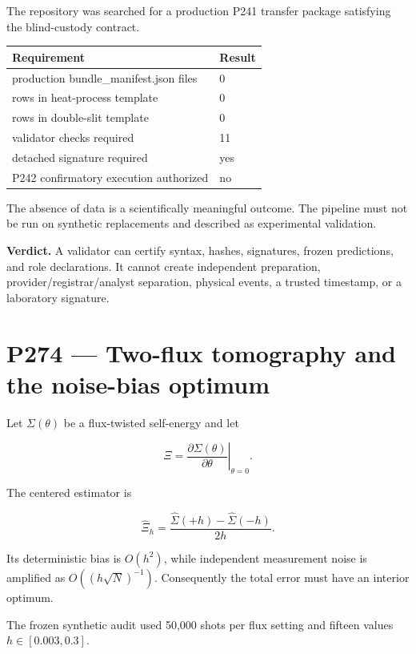 \documentclass[11pt,a4paper,openany]{report}
\begin{document}
The repository was searched for a production P241 transfer package satisfying the blind-custody contract.

\begin{center}
\begingroup\small
\setlength{\tabcolsep}{2.5pt}
\renewcommand{\arraystretch}{1.16}
\begin{longtable}{@{}p{}p{}@{}}
\toprule
\textbf{Requirement} & \textbf{Result} \\
\midrule
\endhead
production bundle\_manifest.json files & 0 \\
rows in heat-process template & 0 \\
rows in double-slit template & 0 \\
validator checks required & 11 \\
detached signature required & yes \\
P242 confirmatory execution authorized & no \\
\bottomrule
\end{longtable}
\endgroup
\end{center}

The absence of data is a scientifically meaningful outcome. The pipeline must not be run on synthetic replacements and described as experimental validation.

\textbf{Verdict.} A validator can certify syntax, hashes, signatures, frozen predictions, and role declarations. It cannot create independent preparation, provider/\allowbreak{}registrar/\allowbreak{}analyst separation, physical events, a trusted timestamp, or a laboratory signature.

\chapter{P274 --- Two-flux tomography and the noise-bias optimum}

Let \(\Sigma(\theta)\) be a flux-twisted self-energy and let

\[
\Xi
=
\left.\frac{\partial\Sigma(\theta)}
{\partial\theta}\right|_{\theta=0}.
\]

The centered estimator is

\[
\widehat\Xi_h
=
\frac{\widehat\Sigma(+h)-\widehat\Sigma(-h)}{2h}.
\]

Its deterministic bias is \(O(h^2)\), while independent measurement noise is amplified as \(O((h\sqrt N)^{-1})\). Consequently the total error must have an interior optimum.

The frozen synthetic audit used 50,000 shots per flux setting and fifteen values \(h\in[0.003,0.3]\).
\end{document}
